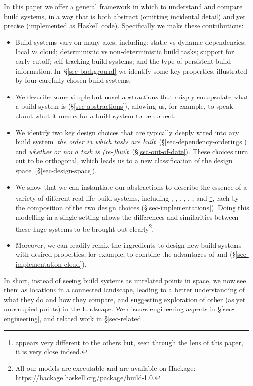 In this paper we offer a general framework in which to understand and compare
build systems, in a way that is both abstract (omitting incidental detail)
and yet precise (implemented as Haskell code). Specifically we make these
contributions:
\begin{itemize}
\item Build systems vary on many axes, including: static vs dynamic
  dependencies; local vs cloud; deterministic vs non-deterministic build tasks;
  support for early cutoff; self-tracking build systems; and the type of
  persistent build information. In~\S\ref{sec-background} we identify some key
  properties, illustrated by four carefully-chosen build systems.

\item We describe some simple but novel abstractions that
  crisply encapsulate what a build system is (\S\ref{sec-abstractions}),
  allowing us, for example, to speak about what it means for a build system to be correct.

\item We identify two key design choices that are typically deeply wired into
  any build system: \emph{the order in which tasks are
  built}~(\S\ref{sec-dependency-orderings}) and \emph{whether or not a
  task is (re-)built}~(\S\ref{sec-out-of-date}). These choices turn out to
  be orthogonal, which leads us to a new classification of the design
  space~(\S\ref{sec-design-space}).

\item We show that we can instantiate our abstractions to describe the essence
of a variety of different real-life build systems, including \Make, \Shake,
\Bazel, \CloudBuild, \Buck, \Nix, and \Excel\footnote{\Excel appears very
different to the others but, seen through the lens of this paper, it is very
close indeed.}, each by the composition of the two design choices
(\S\ref{sec-implementations}). Doing this modelling in a single setting
allows the differences and similarities between these huge systems to be
brought out clearly\footnote{All our models are executable and are available on
Hackage: \url{https://hackage.haskell.org/package/build-1.0}.}.

\item Moreover, we can readily remix the ingredients to design new build systems
with desired properties, for example, to combine the advantages of \Shake and
\Bazel (\S\ref{sec-implementation-cloud}).

\end{itemize}
In short, instead of seeing build systems as unrelated
points in space, we now see them as locations in a connected landscape,
leading to a better understanding of what they do and how they compare,
and suggesting exploration of other (as yet unoccupied points) in the
landscape.
We discuss engineering aspects in \S\ref{sec-engineering}, and related
work in \S\ref{sec-related}.

